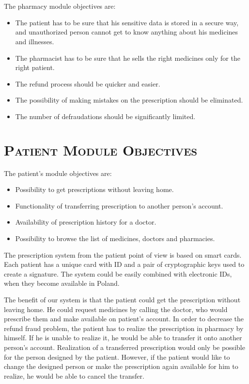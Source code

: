 \section{}

The pharmacy module objectives are:
\begin{itemize}
\item  The patient has to be sure that his sensitive data is stored in a secure way, and unauthorized person cannot get to know anything about his medicines and illnesses. 
\item The pharmacist has to be sure that he sells the right medicines only for the right patient. 
\item The refund process should be quicker and easier. 
\item The possibility of making mistakes on the prescription should be eliminated. 
\item The number of defraudations should be significantly limited.
\end{itemize}

\section{\textsc{Patient Module Objectives}}

The patient's  module objectives are:
\begin{itemize}
\item Possibility to get prescriptions without leaving home.
\item Functionality of transferring prescription to another person's account.
\item Availability of prescription history for a doctor.
\item Possibility to browse the list of medicines, doctors and pharmacies.
\end{itemize}

The prescription system from the patient point of view is based on smart cards. 
Each patient has a unique card with ID and a pair of cryptographic keys used to create a signature. 
The system could be easily combined with electronic IDs, when they become available in Poland.

The benefit of our system is that the patient could get the prescription without leaving home. 
He could request medicines by calling the doctor, who would prescribe them and make available on patient's account. 
In order to decrease the refund fraud problem, the patient has to realize the prescription in pharmacy by himself. 
If he is unable to realize it, he would be able to transfer it onto another person's account. 
Realization of a transferred prescription would only be possible for the person designed by the patient. 
However, if the patient would like to change the designed person or make the prescription again available for him to realize, he would be able to cancel the transfer.

